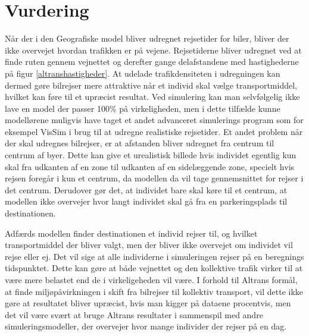 

\section{Vurdering}
Når der i den Geografiske model bliver udregnet rejsetider for biler, bliver der ikke overvejet hvordan trafikken er på vejene. Rejsetiderne bliver udregnet ved at finde ruten gennem vejnettet og derefter gange delafstandene med hastighederne på figur \ref{altranshastigheder}. At udelade trafikdensiteten i udregningen kan dermed gøre bilrejser mere attraktive når et individ skal vælge transportmiddel, hvilket kan føre til et upræcist resultat. Ved simulering kan man selvfølgelig ikke lave en model der passer 100\% på virkeligheden, men i dette tilfælde kunne modellørene muligvis have taget et andet advanceret simulerings program som for eksempel VisSim i brug til at udregne realistiske rejsetider. Et andet problem når der skal udregnes bilrejser, er at afstanden bliver udregnet fra centrum til centrum af byer. Dette kan give et urealistisk billede hvis individet egentlig kun skal fra udkanten af en zone til udkanten af en sidelæggende zone, specielt hvis rejsen foregår i kun et centrum, da modellen da vil tage gennemsnittet for rejser i det centrum. Derudover gør det, at individet bare skal køre til et centrum, at modellen ikke overvejer hvor langt individet skal gå fra en parkeringsplads til destinationen. 

\vspace{5mm}

Adfærds modellen finder destinationen et individ rejser til, og hvilket transportmiddel der bliver valgt, men der bliver ikke overvejet om individet vil rejse eller ej. Det vil sige at alle individerne i simuleringen rejser på en beregnings tidspunktet. Dette kan gøre at både vejnettet og den kollektive trafik virker til at være mere belastet end de i virkeligeheden vil være. I forhold til Altrans formål, at finde miljøpåvirkningen i skift fra bilrejser til kollektiv transport, vil dette ikke gøre at resultatet bliver upræcist, hvis man kigger på dataene procentvis, men det vil være svært at bruge Altrans resultater i sammenspil med andre simuleringsmodeller, der overvejer hvor mange individer der rejser på en dag.

